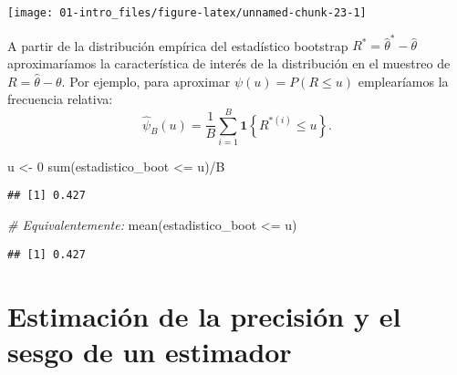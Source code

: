 \documentclass[
]{book}
\newenvironment{Shaded}{\begin{snugshade}}{\end{snugshade}}
\newcommand{\CommentTok}[1]{\textcolor[rgb]{0.56,0.35,0.01}{\textit{#1}}}
\newcommand{\DecValTok}[1]{\textcolor[rgb]{0.00,0.00,0.81}{#1}}
\newcommand{\FunctionTok}[1]{\textcolor[rgb]{0.00,0.00,0.00}{#1}}
\newcommand{\NormalTok}[1]{#1}
\newcommand{\OtherTok}[1]{\textcolor[rgb]{0.56,0.35,0.01}{#1}}
\newcommand{\SpecialCharTok}[1]{\textcolor[rgb]{0.00,0.00,0.00}{#1}}
\theoremstyle{break}
\theoremstyle{definition}
\theoremstyle{definition}
\theoremstyle{definition}
\theoremstyle{definition}
\theoremstyle{remark}
\begin{document}
\begin{Shaded}
\end{Shaded}

\begin{center}\texttt{[image: 01-intro\_files/figure-latex/unnamed-chunk-23-1]} \end{center}

A partir de la distribución empírica del estadístico bootstrap \(R^{\ast} = \hat \theta^{\ast} - \hat \theta\) aproximaríamos la característica de interés de la distribución en el muestreo de \(R = \hat \theta - \theta\).
Por ejemplo, para aproximar \(\psi \left( u \right) =P\left( R\leq u \right)\) emplearíamos la frecuencia relativa:
\[\hat{\psi}_{B}\left( u \right) =
\frac{1}{B}\sum_{i=1}^{B}\mathbf{1}\left\{ R^{\ast (i)}\leq u\right\}.\]

\begin{Shaded}
\begin{Highlighting}[]
\NormalTok{u }\OtherTok{\textless{}{-}} \DecValTok{0}
\FunctionTok{sum}\NormalTok{(estadistico\_boot }\SpecialCharTok{\textless{}=}\NormalTok{ u)}\SpecialCharTok{/}\NormalTok{B}
\end{Highlighting}
\end{Shaded}

\begin{verbatim}
## [1] 0.427
\end{verbatim}

\begin{Shaded}
\begin{Highlighting}[]
\CommentTok{\# Equivalentemente:}
\FunctionTok{mean}\NormalTok{(estadistico\_boot }\SpecialCharTok{\textless{}=}\NormalTok{ u)}
\end{Highlighting}
\end{Shaded}

\begin{verbatim}
## [1] 0.427
\end{verbatim}

\hypertarget{prec-sesgo}{%
\chapter{Estimación de la precisión y el sesgo de un estimador}\label{prec-sesgo}}
\end{document}
